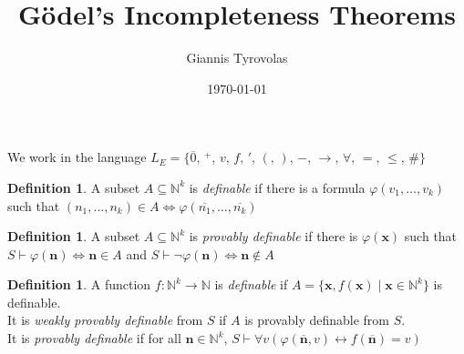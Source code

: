 \documentclass[a4paper,10pt]{article}
\title{Gödel's Incompleteness Theorems}
\author{Giannis Tyrovolas}
\date{\today}
\theoremstyle{definition}
\newtheorem{definition}[theorem]{Definition}
\let\vec\mathbf
\begin{document}
We work in the language ${L}_E = \{\overline{0}, \,{}^+, \,v,\, f,\, ',\, (,\, ),\, -,\, \rightarrow, \,\forall, \,= ,\, \leqslant, \,\#\}$

\begin{definition}
    A subset $A \subseteq \mathbb{N}^k$ is \emph{definable} if there is a formula $\varphi(v_1, \ldots, v_k)$ such that 
    $(n_1, \ldots, n_k) \in A \iff \varphi(\overline{n_1}, \ldots, \overline{n_k})$
\end{definition}

\begin{definition}
    A subset $A \subseteq \mathbb{N}^k$ is \emph{provably definable} if there is $\varphi(\vec{x})$ such that $S \vdash \varphi(\vec{n}) \iff \vec{n} \in A$ and $S \vdash \neg\varphi(\vec{n}) \iff \vec{n} \notin A$ 
\end{definition}

\begin{definition}
    A function $f \colon \mathbb{N}^k \longrightarrow \mathbb{N}$ is \emph{definable} if $A = \{\vec{x}, f(\vec{x}) \mid \vec{x} \in \mathbb{N}^k\}$ is definable.\\
    It is \emph{weakly provably definable} from $S$ if $A$ is provably definable from $S$.\\
    It is \emph{provably definable} if for all $\vec{n} \in \mathbb{N}^k$, $S \vdash \forall v \left(\varphi(\overline{\vec{n}}, v) \leftrightarrow  f(\overline{\vec{n}}) = v\right)$
\end{definition}
\end{document}
